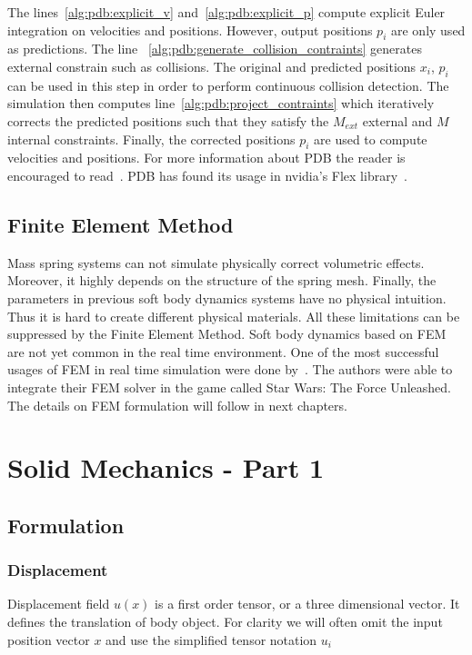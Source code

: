 \documentclass[en]{minipw} %
\begin{document}
The lines~\ref{alg:pdb:explicit_v} and~\ref{alg:pdb:explicit_p} compute explicit Euler integration on velocities and positions. However, output positions $p_i$ are only used as predictions. 
The line ~\ref{alg:pdb:generate_collision_contraints} generates external constrain such as collisions. The original and predicted positions $x_i$, $p_i$ can be used in this step in order to perform continuous collision detection.
The simulation then computes line~\ref{alg:pdb:project_contraints} which iteratively corrects the predicted positions such that they satisfy the $M_{ext}$ external and $M$ internal constraints.
Finally, the corrected positions $p_i$ are used to compute velocities and positions. For more information about PDB the reader is encouraged to read~\cite{physics_notes}.
PDB has found its usage in nvidia's Flex library~\cite{flex}.

\section{Finite Element Method}
Mass spring systems can not simulate physically correct volumetric effects. Moreover, it highly depends on the structure of the spring mesh. Finally, the parameters in previous soft body dynamics systems have no physical intuition. Thus it is hard to create different physical materials. All these limitations can be suppressed by the Finite Element Method. Soft body dynamics based on FEM are not yet common in the real time environment. One of the most successful usages of FEM in real time simulation were done by~\cite{parker}. The authors were able to integrate their FEM solver in the game called Star Wars: The Force Unleashed. The details on FEM formulation will follow in next chapters.

\chapter{Solid Mechanics - Part 1}
\label{chap:solid_mechanics1}

\section{Formulation}
\subsection{Displacement}
Displacement field $u(x)$ is a first order tensor, or a three dimensional vector. It defines the translation of body object. For clarity we will often omit the input position vector $x$ and use the simplified tensor notation $u_i$
\end{document}
